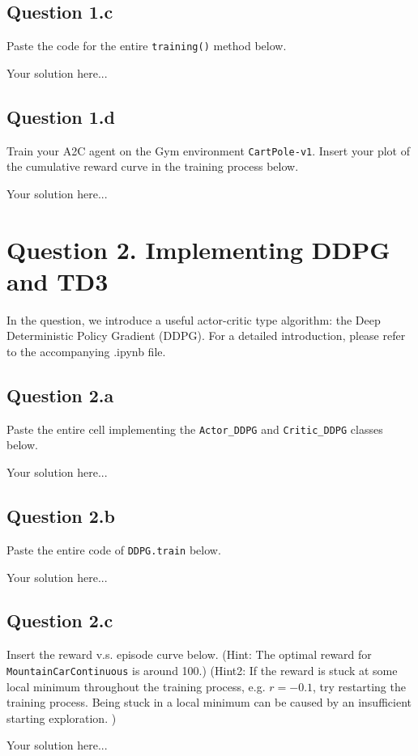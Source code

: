 \documentclass[12pt]{article}
\begin{document}
\subsection*{Question 1.c}
Paste the code for the entire \texttt{training()} method below.
\begin{solution}
Your solution here...
\end{solution}
\subsection*{Question 1.d}
Train your A2C agent on the Gym environment \texttt{CartPole-v1}. Insert your plot of the cumulative reward curve in the training process below. 
\begin{solution}
Your solution here...
\end{solution}
\section*{Question 2. Implementing DDPG and TD3}
In the question, we introduce a useful actor-critic type algorithm:  the Deep Deterministic Policy Gradient (DDPG). For a detailed introduction, please refer to the accompanying .ipynb file.
\subsection*{Question 2.a} 
Paste the entire cell implementing the \texttt{Actor\_DDPG} and \texttt{Critic\_DDPG} classes below.
\begin{solution}
Your solution here...
\end{solution}
\subsection*{Question 2.b} 
Paste the entire code of \texttt{DDPG.train} below.
\begin{solution}
Your solution here...
\end{solution}
\subsection*{Question 2.c}
Insert the reward v.s. episode curve below.  (Hint: The optimal reward for \texttt{MountainCarContinuous} is around 100.) (Hint2: If the reward is stuck at some local minimum throughout the training process, e.g. $r= -0.1$, try restarting the training process. Being stuck in a local minimum can be caused by an insufficient starting exploration. )
\begin{solution}
Your solution here...
\end{solution}
\end{document}
